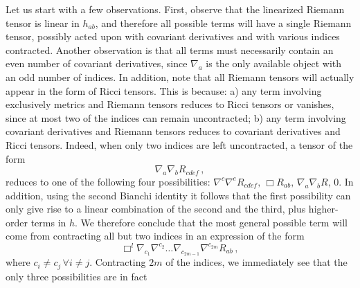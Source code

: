 \documentclass[11pt]{article}
\begin{document}
Let us start with a few observations. First, observe that the linearized Riemann tensor is linear in $h_{ab}$, and therefore all possible terms will have a single Riemann tensor, possibly acted upon with covariant derivatives and with various indices contracted. %
Another observation is that all terms must necessarily contain an even number of covariant derivatives, since $\nabla_a$ is the only available object with an odd number of indices.  In addition, note that all Riemann tensors will actually appear in the form of Ricci tensors. This is because: a) any term involving exclusively metrics and Riemann tensors reduces to Ricci tensors or vanishes, since at most two of the indices can remain uncontracted; b) any term involving covariant derivatives and Riemann tensors reduces to covariant derivatives and Ricci tensors. Indeed,  when only two indices are left uncontracted, a tensor of the form
\begin{equation}
\nabla_a\nabla_b R_{cdef}\, ,
\end{equation}
reduces to one of the following four possibilities: $\nabla^c\nabla^e R_{cdef},\, \Box R_{ab},\, \nabla_a \nabla_b R,\, 0 $. In addition, using the second Bianchi identity it follows that the first possibility can only give rise to a linear combination of the second and the third, plus higher-order terms in $h$. 
We therefore conclude that the most general possible term will come from contracting all but two indices in an expression of the form
\begin{equation}
\Box^l \nabla_{c_1}\nabla^{c_2} \dots \nabla_{c_{2m-1}}\nabla^{c_{2m}} R_{ab}\,,
\end{equation}
where $c_i \neq c_j \, \forall i\neq j$. Contracting $2m$ of the indices, we immediately see that the only three possibilities are in fact
\end{document}
